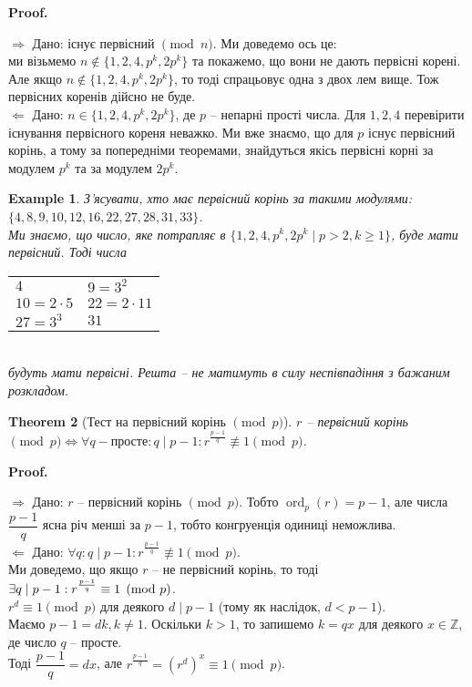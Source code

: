\documentclass[a4paper, 14pt]{extarticle}
\makeatletter
\theoremstyle{theoremdd}
\newtheorem{theorem}{Theorem}[subsection]
\theoremstyle{theoremdd}
\theoremstyle{theoremdd}
\theoremstyle{theoremdd}
\newtheorem{example}[theorem]{Example}
\theoremstyle{theoremdd}
\theoremstyle{theoremdd}
\theoremstyle{theoremdd}
\theoremstyle{theoremdd}
\def\qed{$\blacksquare$}
\def\rightproof{$\boxed{\Rightarrow}$ }
\def\leftproof{$\boxed{\Leftarrow}$ }
\renewenvironment{proof}[1][Proof.\\]{\par
\pushQED{\hfill \qed}%
\normalfont \topsep6\p@\@plus6\p@\relax
\trivlist
\item\relax
{\bfseries
#1\@addpunct{.}}\hspace\labelsep\ignorespaces
}{%
\popQED\endtrivlist\@endpefalse
}
\DeclareMathOperator{\ord}{ord}
\makeatother
\begin{document}
\begin{proof}
\rightproof Дано: існує первісний $\!\! \pmod n$. Ми доведемо ось це:\\
ми візьмемо $n \not\in \{1,2,4,p^k,2p^k\}$ та покажемо, що вони не дають первісні корені. Але якщо $n \not \in \{1,2,4,p^k,2p^k\}$, то тоді спрацьовує одна з двох лем вище. Тож первісних коренів дійсно не буде.
\bigskip \\
\leftproof Дано: $n \in \{1,2,4,p^k,2p^k\}$, де $p$ -- непарні прості числа. Для $1,2,4$ перевірити існування первісного кореня неважко. Ми вже знаємо, що для $p$ існує первісний корінь, а тому за попередніми теоремами, знайдуться якісь первісні корні за модулем $p^k$ та за модулем $2p^k$.
\end{proof}

\begin{example}
З'ясувати, хто має первісний корінь за такими модулями: $\{4,8,9,10,12,16,22,27,28,31,33\}$.\\
Ми знаємо, що число, яке потрапляє в $\{1,2,4,p^k,2p^k \mid p > 2, k \geq 1\}$, буде мати первісний. Тоді числа\\
\begin{tabular}{ll}
$4$ & $9 = 3^2$\\
$10 = 2 \cdot 5$ & $22 = 2 \cdot 11$\\
$27 = 3^3$ & $31$
\end{tabular}\\
будуть мати первісні. Решта -- не матимуть в силу неспівпадіння з бажаним розкладом.
\end{example}

\begin{theorem}[Тест на первісний корінь $\!\! \pmod p$]
$r$ -- первісний корінь $\pmod p \iff \forall q - \text{просте}: q \mid p-1: r^{\frac{p-1}{q}} \not\equiv 1 \pmod p$.
\end{theorem}

\begin{proof}
\rightproof Дано: $r$ -- первісний корінь $\pmod p$. Тобто $\ord_p (r) = p-1$, але числа $\dfrac{p-1}{q}$ ясна річ менші за $p-1$, тобто конгруенція одиниці неможлива.
\bigskip \\
\leftproof Дано: $\forall q: q \mid p-1: r^{\frac{p-1}{q}} \not\equiv 1 \pmod p$.\\
Ми доведемо, що якщо $r$ -- не первісний корінь, то тоді $\exists q \mid p-1:\\ r^{\frac{p-1}{q}} \equiv 1 \pmod p$.\\
$r^d \equiv 1 \pmod p$ для деякого $d \mid p-1$ (тому як наслідок, $d < p-1$).\\
Маємо $p-1 = dk, k \neq 1$. Оскільки $k>1$, то запишемо $k = qx$ для деякого $x \in \mathbb{Z}$, де число $q$ -- просте.\\
Тоді $\dfrac{p-1}{q} = dx$, але $r^{\frac{p-1}{q}} = (r^d)^x \equiv 1 \pmod p$.
\end{proof}
\end{document}
